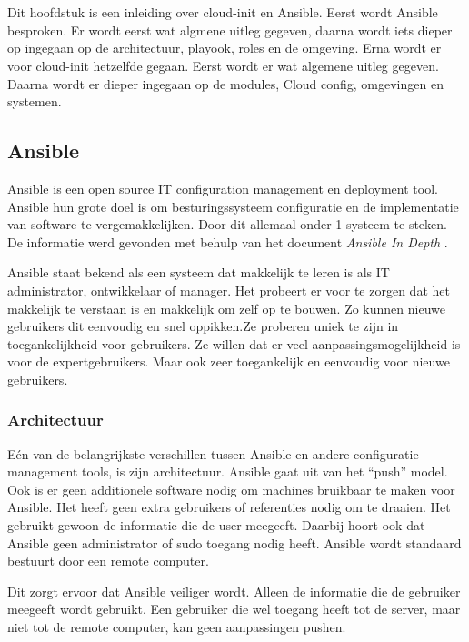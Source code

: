 \chapter{}
\label{ch:inleidingtotansibleencloudinit}

Dit hoofdstuk is een inleiding over cloud-init en Ansible. Eerst wordt Ansible besproken. Er wordt eerst wat algmene uitleg gegeven, daarna wordt iets dieper op ingegaan op de architectuur, playook, roles en de omgeving. Erna wordt er voor cloud-init hetzelfde gegaan. Eerst wordt er wat algemene uitleg gegeven. Daarna wordt er dieper ingegaan op de modules, Cloud config, omgevingen en systemen.


\section{Ansible}
Ansible is een open source IT configuration management en deployment tool. Ansible hun grote doel is om besturingssysteem configuratie en de implementatie van software te vergemakkelijken. Door dit allemaal onder 1 systeem te steken. De informatie werd gevonden met behulp van het document \textit{Ansible In Depth} \autocite{ansibleid}.

Ansible staat bekend als een systeem dat makkelijk te leren is als IT administrator, ontwikkelaar of manager. Het probeert er voor te zorgen dat het makkelijk te verstaan is en makkelijk om zelf op te bouwen. Zo kunnen nieuwe gebruikers dit eenvoudig en snel oppikken.Ze proberen uniek te zijn in toegankelijkheid voor gebruikers. Ze willen dat er veel aanpassingsmogelijkheid is voor de expertgebruikers. Maar ook zeer toegankelijk en eenvoudig voor nieuwe gebruikers.

\newpage
\subsection{Architectuur}
Eén van de belangrijkste verschillen tussen Ansible en andere configuratie management tools, is zijn architectuur. Ansible gaat uit van het ``push'' model. Ook is er geen additionele software nodig om machines bruikbaar te maken voor Ansible. Het heeft geen extra gebruikers of referenties nodig om te draaien. Het gebruikt gewoon de informatie die de user meegeeft. Daarbij hoort ook dat Ansible geen administrator of sudo toegang nodig heeft. Ansible wordt standaard bestuurt door een remote computer.

Dit zorgt ervoor dat Ansible veiliger wordt. Alleen de informatie die de gebruiker meegeeft wordt gebruikt. Een gebruiker die wel toegang heeft tot de server, maar niet tot de remote computer, kan geen aanpassingen pushen.

